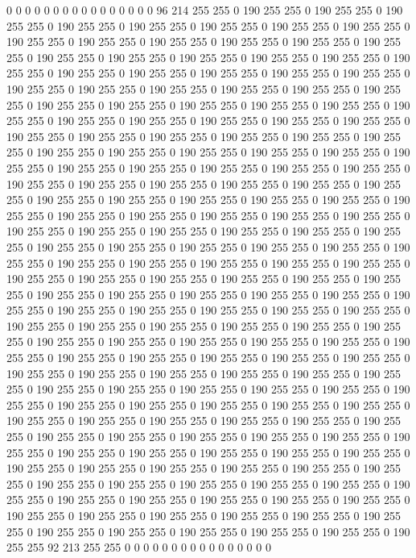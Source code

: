 0 0 0 0 0 0 0 0 0 0 0 0 0 0 0 0 96 214 255 255 0 190 255 255 0 190 255 255 0 190 255 255 0 190 255 255 0 190 255 255 0 190 255 255 0 190 255 255 0 190 255 255 0 190 255 255 0 190 255 255 0 190 255 255 0 190 255 255 0 190 255 255 0 190 255 255 0 190 255 255 0 190 255 255 0 190 255 255 0 190 255 255 0 190 255 255 0 190 255 255 0 190 255 255 0 190 255 255 0 190 255 255 0 190 255 255 0 190 255 255 0 190 255 255 0 190 255 255 0 190 255 255 0 190 255 255 0 190 255 255 0 190 255 255 0 190 255 255 0 190 255 255 0 190 255 255 0 190 255 255 0 190 255 255 0 190 255 255 0 190 255 255 0 190 255 255 0 190 255 255 0 190 255 255 0 190 255 255 0 190 255 255 0 190 255 255 0 190 255 255 
0 190 255 255 0 190 255 255 0 190 255 255 0 190 255 255 0 190 255 255 0 190 255 255 0 190 255 255 0 190 255 255 0 190 255 255 0 190 255 255 0 190 255 255 0 190 255 255 0 190 255 255 0 190 255 255 0 190 255 255 0 190 255 255 0 190 255 255 0 190 255 255 0 190 255 255 0 190 255 255 0 190 255 255 0 190 255 255 0 190 255 255 0 190 255 255 0 190 255 255 0 190 255 255 0 190 255 255 0 190 255 255 0 190 255 255 0 190 255 255 0 190 255 255 0 190 255 255 0 190 255 255 0 190 255 255 0 190 255 255 0 190 255 255 0 190 255 255 0 190 255 255 0 190 255 255 0 190 255 255 0 190 255 255 0 190 255 255 0 190 255 255 0 190 255 255 0 190 255 255 0 190 255 255 0 190 255 255 0 190 255 255 0 190 255 255 0 190 255 255 
0 190 255 255 0 190 255 255 0 190 255 255 0 190 255 255 0 190 255 255 0 190 255 255 0 190 255 255 0 190 255 255 0 190 255 255 0 190 255 255 0 190 255 255 0 190 255 255 0 190 255 255 0 190 255 255 0 190 255 255 0 190 255 255 0 190 255 255 0 190 255 255 0 190 255 255 0 190 255 255 0 190 255 255 0 190 255 255 0 190 255 255 0 190 255 255 0 190 255 255 0 190 255 255 0 190 255 255 0 190 255 255 0 190 255 255 0 190 255 255 0 190 255 255 0 190 255 255 0 190 255 255 0 190 255 255 0 190 255 255 0 190 255 255 0 190 255 255 0 190 255 255 0 190 255 255 0 190 255 255 0 190 255 255 0 190 255 255 0 190 255 255 0 190 255 255 0 190 255 255 0 190 255 255 0 190 255 255 0 190 255 255 0 190 255 255 0 190 255 255 
0 190 255 255 0 190 255 255 0 190 255 255 0 190 255 255 0 190 255 255 0 190 255 255 0 190 255 255 0 190 255 255 0 190 255 255 0 190 255 255 0 190 255 255 0 190 255 255 0 190 255 255 0 190 255 255 0 190 255 255 0 190 255 255 0 190 255 255 0 190 255 255 0 190 255 255 0 190 255 255 0 190 255 255 0 190 255 255 0 190 255 255 0 190 255 255 0 190 255 255 0 190 255 255 0 190 255 255 0 190 255 255 0 190 255 255 0 190 255 255 0 190 255 255 0 190 255 255 0 190 255 255 0 190 255 255 0 190 255 255 0 190 255 255 0 190 255 255 0 190 255 255 0 190 255 255 0 190 255 255 0 190 255 255 0 190 255 255 0 190 255 255 0 190 255 255 0 190 255 255 92 213 255 255 0 0 0 0 0 0 0 0 0 0 0 0 0 0 0 0 
